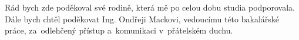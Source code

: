 \documentclass[11pt,twoside,a4paper]{book}
\begin{document}
	
	\translate				%

	

	

	\coverpagestarts


	\acknowledgements
	\noindent
	Rád bych zde poděkoval své rodině, která mě po celou dobu studia podporovala. Dále bych chtěl poděkovat Ing. Ondřeji Mackovi, vedoucímu této bakalářské práce, za~odlehčený přístup a~komunikaci v~přátelském duchu.





 
\end{document}
